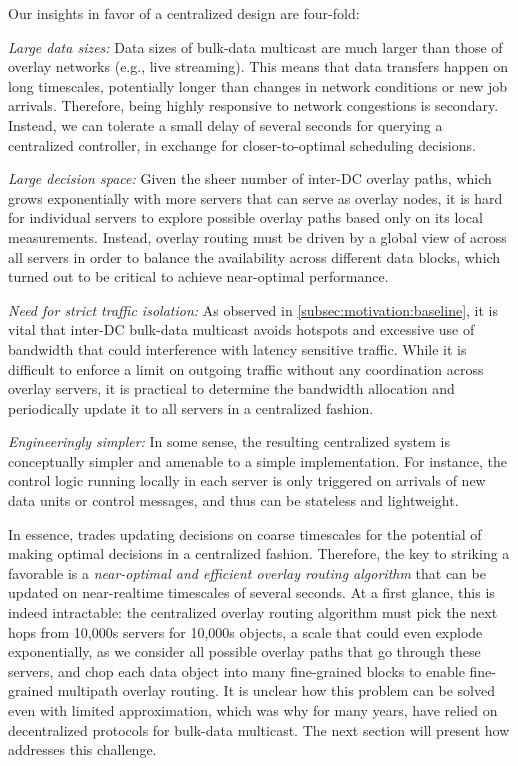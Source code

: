 Our insights in favor of a centralized design are four-fold:
\begin{packedenumerate}
\item {\em Large data sizes:}
Data sizes of bulk-data multicast are much larger
than those of overlay networks (e.g., live streaming).
This means that data transfers happen on long timescales,
potentially longer than changes in network conditions or
new job arrivals.
Therefore, being highly responsive to network congestions
is secondary.
Instead, we can tolerate a small delay of several seconds for
querying a centralized controller,
in exchange for closer-to-optimal scheduling decisions.
\item {\em Large decision space:}
Given the sheer number of inter-DC overlay paths,
which grows exponentially with more servers that can
serve as overlay nodes,
it is hard for individual servers to explore possible overlay
paths based only on its local measurements.
Instead, overlay routing must be driven by a global
view of across all servers in order to
balance the availability across different data blocks, which
turned out to be critical to achieve near-optimal performance.
\item {\em Need for strict traffic isolation:}
As observed in \Section\ref{subsec:motivation:baseline}, it is vital that inter-DC
bulk-data multicast avoids hotspots and excessive use of
bandwidth that could interference with latency sensitive traffic.
While it is difficult to enforce a limit on outgoing traffic
without any coordination across overlay servers, it is practical
to determine the bandwidth allocation and periodically update it
to all servers in a centralized fashion.
\item {\em Engineeringly simpler:}
In some sense, the resulting centralized system is conceptually
simpler and amenable to a simple implementation.
For instance, the control logic running locally in each server
is only triggered on arrivals of new data units or control messages,
and thus can be stateless and lightweight.

\end{packedenumerate}

In essence, \name trades updating decisions on coarse timescales
for the potential of making optimal decisions in a centralized
fashion.
Therefore, the key to striking a favorable is a
{\em near-optimal and efficient overlay routing
algorithm} that can be updated on near-realtime timescales of
several seconds.
At a first glance, this is indeed intractable:
the centralized overlay routing algorithm must pick the next hops
from 10,000s servers for 10,000s objects, a scale that could
even explode exponentially, as we consider all possible
overlay paths that go through these servers, and chop each data
object into many fine-grained blocks to enable fine-grained
multipath overlay routing.
It is unclear how this problem can be solved even with
limited approximation, which was why for many years, \company have
relied on decentralized protocols for bulk-data multicast.
The next section  will present how \name addresses this
challenge.

